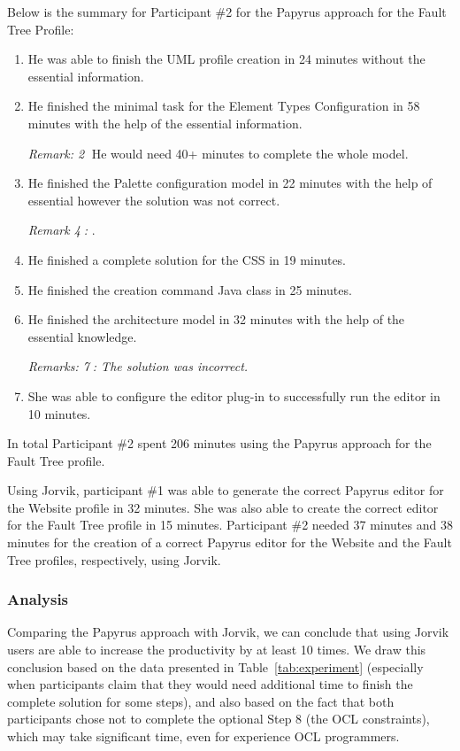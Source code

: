 Below is the summary for Participant \#2 for the Papyrus approach for the Fault Tree Profile:

\begin{enumerate}
	\item He was able to finish the UML profile creation in 24 minutes without the essential information. 
	\item He finished the minimal task for the Element Types Configuration in 58 minutes with the help of the essential information. 
	
	\textit{Remark: \textcircled{2}} He would need 40+ minutes to complete the whole model.
	\item He finished the Palette configuration model in 22 minutes with the help of essential however the solution was not correct.
	
	\textit{Remark \textcircled{4}:} .
	\item He finished a complete solution for the CSS in 19 minutes.
	\item He finished the creation command Java class in 25 minutes.
	\item He finished the architecture model in 32 minutes with the help of the essential knowledge. 
	
	\textit{Remarks: \textcircled{7}: The solution was incorrect.}
	\item She was able to configure the editor plug-in to successfully run the editor in 10 minutes.
\end{enumerate}
In total Participant \#2 spent 206 minutes using the Papyrus approach for the Fault Tree profile.


Using Jorvik, participant \#1 was able to generate the correct Papyrus editor for the Website profile in 32 minutes. She was also able to create the correct editor for the Fault Tree profile in 15 minutes.
Participant \#2 needed 37 minutes and 38 minutes for the creation of a correct Papyrus editor for the Website and the Fault Tree profiles, respectively, using Jorvik.

\subsubsection{Analysis}
Comparing the Papyrus approach with Jorvik, we can conclude that using Jorvik users are able to increase the productivity by at least 10 times. 
We draw this conclusion based on the data presented in Table~\ref{tab:experiment} (especially when participants claim that they would need additional time to finish the complete solution for some steps), and also based on the fact that both participants chose not to complete the optional Step 8 (the OCL constraints), which may take significant time, even for experience OCL programmers.


